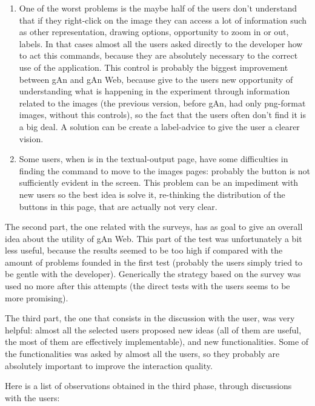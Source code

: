 \begin{enumerate}
\item 
One of the worst problems is the maybe half of the users don't understand that if they right-click on the image they can access a lot of information such as other representation, drawing options, opportunity to zoom in or out, labels. In that cases almost all the users asked directly to the developer how to act this commands, because they are absolutely necessary to the correct use of the application. This control is probably the biggest improvement between gAn and gAn Web, because give to the users new opportunity of understanding what is happening in the experiment through information related to the images (the previous version, before gAn, had only png-format images, without this controls), so the fact that the users often don't find it is a big deal. A solution can be create a label-advice to give the user a clearer vision.

\item
Some users, when is in the textual-output page, have some difficulties in finding the command to move to the images pages: probably the button is not sufficiently evident in the screen. This problem can be an impediment with new users so the best idea is solve it, re-thinking the distribution of the buttons in this page, that are actually not very clear. 

\end{enumerate}

The second part, the one related with the surveys, has as goal to give an overall idea about the utility of gAn Web. This part of the test was unfortunately a bit less useful, because the results seemed to be too high if compared with the amount of problems founded in the first test (probably the users simply tried to be gentle with the developer). Generically the strategy based on the survey was used no more after this attempts (the direct tests with the users seems to be more promising).

The third part, the one that consists in the discussion with the user, was very helpful: almost all the selected users proposed new ideas (all of them are useful, the most of them are effectively implementable), and new functionalities. Some of the functionalities was asked by almost all the users, so they probably are absolutely important to improve the interaction quality. 

Here is a list of observations obtained in the third phase, through discussions with the users:

